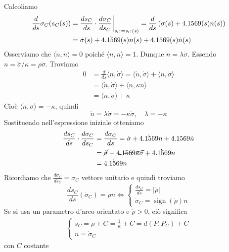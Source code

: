 \documentclass[a4paper]{article}
\begin{document}
\begin{snippetproof}{}
    Calcoliamo \begin{align*}
        \frac{d}{ds} \sigma_C(s_C(s))
        &= \restr{
            \frac{ds_C}{ds} \cdot \frac{d\sigma_C}{ds_C}
        }{
            s_C=s_C(s)
        } = \frac{d}{ds} \left(
            \sigma(s) + \rho(s)n(s)
        \right) \\
        &= \dot\sigma(s) + \dot\rho(s)n(s) + \rho(s)\dot n(s)
    \end{align*}
    Osserviamo che \(\langle \dot n, n \rangle = 0\) poiché \(\langle n, n \rangle = 1\).
    Dunque \(\dot n = \lambda \dot\sigma\). Essendo \(n = \ddot\sigma / \kappa = \rho \ddot \sigma\).
    Troviamo \begin{align*}
        0 &= \frac{d}{ds} \langle n, \dot\sigma \rangle
        = \langle \dot n, \dot\sigma\rangle + \langle n, \ddot\sigma\rangle \\
        &= \langle \dot n, \dot\sigma \rangle + \langle n, \kappa n\rangle \\
        &= \langle \dot n, \dot\sigma \rangle + \kappa
    \end{align*}
    Cioè \(\langle \dot n, \dot \sigma \rangle =-\kappa\), quindi
    \[
        \dot n = \lambda \dot \sigma = - \kappa \dot \sigma, \quad \lambda = - \kappa
    \]
    Sostituendo nell'espressione iniziale otteniamo
    \begin{align*}
        \frac{ds_C}{ds} \cdot \frac{d\sigma_C}{ds_C}
        &= \frac{d\sigma_C}{ds} = \dot\sigma + \dot\rho n + \rho \dot n \\
        &= \cancel{\dot \sigma} - \cancel{\rho \kappa \dot \sigma} + \dot \rho n \\
        &= \dot \rho n
    \end{align*}
    Ricordiamo che \(\frac{d\sigma_C}{ds_C} = \dot\sigma_C\) vettore unitario e quindi troviamo
    \[
        \frac{ds_C}{ds}\left(\dot\sigma_C\right) = \dot\rho n \iff
        \begin{cases}
            \frac{ds_C}{ds} = |\dot\rho| \\
            \dot\sigma_C = \operatorname{sign}(\dot\rho)n
        \end{cases}
    \]
    Se si usa un parametro d'arco orientato e \(\dot\rho>0\), ciò significa \begin{align*}
        \begin{cases}
            s_C = \rho + C = \frac{1}{\kappa} + C = d(P, P_C) + C \\
            n = \dot\sigma_C
        \end{cases}
    \end{align*}
    con \(C\) costante
\end{snippetproof}
\end{document}
